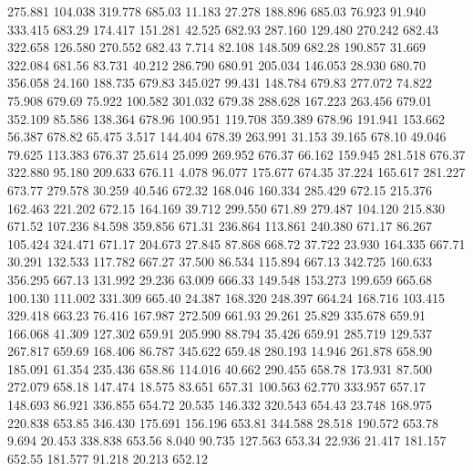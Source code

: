  275.881  104.038  319.778       685.03
  11.183   27.278  188.896       685.03
  76.923   91.940  333.415       683.29
 174.417  151.281   42.525       682.93
 287.160  129.480  270.242       682.43
 322.658  126.580  270.552       682.43
   7.714   82.108  148.509       682.28
 190.857   31.669  322.084       681.56
  83.731   40.212  286.790       680.91
 205.034  146.053   28.930       680.70
 356.058   24.160  188.735       679.83
 345.027   99.431  148.784       679.83
 277.072   74.822   75.908       679.69
  75.922  100.582  301.032       679.38
 288.628  167.223  263.456       679.01
 352.109   85.586  138.364       678.96
 100.951  119.708  359.389       678.96
 191.941  153.662   56.387       678.82
  65.475    3.517  144.404       678.39
 263.991   31.153   39.165       678.10
  49.046   79.625  113.383       676.37
  25.614   25.099  269.952       676.37
  66.162  159.945  281.518       676.37
 322.880   95.180  209.633       676.11
   4.078   96.077  175.677       674.35
  37.224  165.617  281.227       673.77
 279.578   30.259   40.546       672.32
 168.046  160.334  285.429       672.15
 215.376  162.463  221.202       672.15
 164.169   39.712  299.550       671.89
 279.487  104.120  215.830       671.52
 107.236   84.598  359.856       671.31
 236.864  113.861  240.380       671.17
  86.267  105.424  324.471       671.17
 204.673   27.845   87.868       668.72
  37.722   23.930  164.335       667.71
  30.291  132.533  117.782       667.27
  37.500   86.534  115.894       667.13
 342.725  160.633  356.295       667.13
 131.992   29.236   63.009       666.33
 149.548  153.273  199.659       665.68
 100.130  111.002  331.309       665.40
  24.387  168.320  248.397       664.24
 168.716  103.415  329.418       663.23
  76.416  167.987  272.509       661.93
  29.261   25.829  335.678       659.91
 166.068   41.309  127.302       659.91
 205.990   88.794   35.426       659.91
 285.719  129.537  267.817       659.69
 168.406   86.787  345.622       659.48
 280.193   14.946  261.878       658.90
 185.091   61.354  235.436       658.86
 114.016   40.662  290.455       658.78
 173.931   87.500  272.079       658.18
 147.474   18.575   83.651       657.31
 100.563   62.770  333.957       657.17
 148.693   86.921  336.855       654.72
  20.535  146.332  320.543       654.43
  23.748  168.975  220.838       653.85
 346.430  175.691  156.196       653.81
 344.588   28.518  190.572       653.78
   9.694   20.453  338.838       653.56
   8.040   90.735  127.563       653.34
  22.936   21.417  181.157       652.55
 181.577   91.218   20.213       652.12
